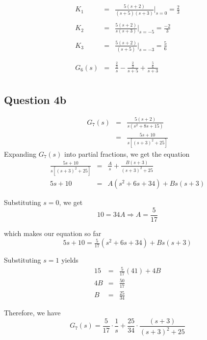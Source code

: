 \documentclass[12pt, a4paper]{article}
\begin{document}
		\begin{equation}
			\begin{array}{rcl}
				K_1 & = & \frac{5(s+2)}{(s+5)(s+3)} \bigg\rvert_{s=0} = \frac{2}{3}\\
				\\
				K_2 & = & \frac{5(s+2)}{s(s+3)} \bigg\rvert_{s=-5} = \frac{-2}{3} \\
				\\
				K_3 & = & \frac{5(s+2)}{(s+5)} \bigg\rvert_{s=-3} = \frac{5}{6} \\
				\\
				\\
				G_6(s) & = & \frac{\frac{2}{3}}{s} - \frac{\frac{2}{3}}{s+5} + \frac{\frac{5}{6}}{s+3}\\
			\end{array}
		\end{equation}

	\subsection*{Question 4b}
		\label{sub:question_4b}
		\[
			\begin{array}{rcl}
				G_7(s) & = & \frac{5(s+2)}{s(s^2 + 8s + 15)}\\
				& = & \frac{5s+10}{s[(s+3)^2 + 25]}
			\end{array}
		\]
		\noindent Expanding $G_7(s)$ into partial fractions, we get the equation
		\[
			\begin{array}{rcl}
				\frac{5s+10}{s[(s+3)^2 + 25]} & = & \frac{A}{s} + \frac{B(s+3)}{(s+3)^2 + 25} \\
				5s + 10 & = & A(s^2 + 6s + 34) + Bs(s+3)
			\end{array}
		\]

		\noindent Substituting $s=0$, we get
		\[
			10 = 34A \Rightarrow A = \frac{5}{17}
		\]

		\noindent which makes our equation so far
		\[
			5s+10 = \tfrac{5}{17}(s^2 +6s + 34) + Bs(s+3)
		\]

		\noindent Substituting $s=1$ yields
		\[
			\begin{array}{rcl}
				15 & = & \tfrac{5}{17}(41) + 4B \\
				4B & = & \tfrac{50}{17} \\
				B & = & \tfrac{25}{34}
			\end{array}
		\]

		\noindent Therefore, we have
		\[
			G_7(s) = \frac{5}{17} \cdot \frac{1}{s} + \frac{25}{34} \cdot \frac{(s+3)}{(s+3)^2 + 25}
		\]
\end{document}
